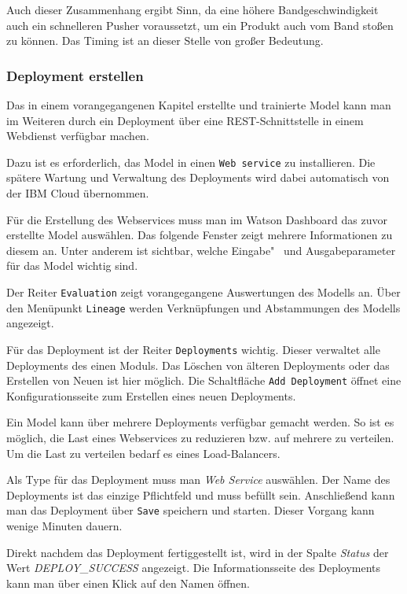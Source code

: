 Auch dieser Zusammenhang ergibt Sinn, da eine höhere Bandgeschwindigkeit auch ein schnelleren Pusher voraussetzt, um ein
Produkt auch vom Band stoßen zu können. Das Timing ist an dieser Stelle von großer Bedeutung.

\subsubsection{Deployment erstellen}
\label{subsec:deployment_erstellen}
Das in einem vorangegangenen Kapitel erstellte und trainierte Model kann man im Weiteren durch ein Deployment über eine
REST-Schnittstelle in einem Webdienst verfügbar machen.

Dazu ist es erforderlich, das Model in einen \texttt{Web service} zu installieren. Die spätere Wartung und Verwaltung
des Deployments wird dabei automatisch von der IBM Cloud übernommen.

Für die Erstellung des Webservices muss man im Watson Dashboard das zuvor erstellte Model auswählen. Das folgende
Fenster zeigt mehrere Informationen zu diesem an. Unter anderem ist sichtbar, welche Eingabe"~ und Ausgabeparameter für
das Model wichtig sind.

Der Reiter \texttt{Evaluation} zeigt vorangegangene Auswertungen des Modells an. Über den Menüpunkt \texttt{Lineage}
werden Verknüpfungen und Abstammungen des Modells angezeigt.

Für das Deployment ist der Reiter \texttt{Deployments} wichtig. Dieser verwaltet alle Deployments des einen Moduls. Das
Löschen von älteren Deployments oder das Erstellen von Neuen ist hier möglich. Die Schaltfläche \texttt{Add Deployment}
öffnet eine Konfigurationsseite zum Erstellen eines neuen Deployments.

Ein Model kann über mehrere Deployments verfügbar gemacht werden. So ist es möglich, die Last eines Webservices zu
reduzieren bzw. auf mehrere zu verteilen. Um die Last zu verteilen bedarf es eines Load-Balancers.

Als Type für das Deployment muss man \textit{Web Service} auswählen. Der Name des Deployments ist das einzige Pflichtfeld
und muss befüllt sein. Anschließend kann man das Deployment über \texttt{Save} speichern und starten. Dieser Vorgang kann
wenige Minuten dauern.

Direkt nachdem das Deployment fertiggestellt ist, wird in der Spalte \textit{Status} der Wert \textit{DEPLOY\_SUCCESS}
angezeigt. Die Informationsseite des Deployments kann man über einen Klick auf den Namen öffnen.

